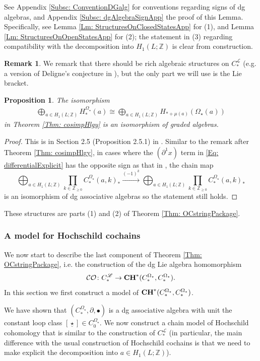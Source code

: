 \documentclass[10pt]{amsart}
\numberwithin{equation}{section}
\theoremstyle{plain}
\newtheorem{proposition}[theorem]{Proposition}
\theoremstyle{definition}
\newtheorem{remark}[theorem]{Remark}
\theoremstyle{remark}
\numberwithin{equation}{section}
\newcommand{\Z}{\mathbb{Z}}
\newcommand{\CO}{\mathcal{CO}}
\newcommand{\CC}{\textbf{\textup{CH}}}
\newcommand{\CFr}{C_*^\mathscr{L}}
\newcommand{\CBa}{C_*^{\Omega_\star}}
\newcommand{\HBa}{H_*^{\Omega_\star}}
\newcommand{\Cba}[1]{C_{#1}^{\Omega_\star}}
\begin{document}
{See Appendix \ref{Subsc: ConventionDGalg} for conventions regarding signs of dg algebras, and Appendix \ref{Subsc: dgAlgebraSignApp} the proof of this Lemma. Specifically, see Lemma \ref{Lm: StructuresOnClosedStatesApp} for  (1), and Lemma  \ref{Lm: StructuresOnOpenStatesApp} for (2); the statement in (3) regarding compatibility with the decomposition into $H_1(L;\Z)$ is clear from construction.



\begin{remark}\label{Rmk: RichStructure}
	We remark that there should be rich algebraic structures on $\CFr$ (e.g. a version of Deligne's conjecture in \cite{Irie1}),  but the only part we will use is the Lie bracket.
\end{remark}

\begin{proposition}
The isomorphism \begin{align*}
		\bigoplus_{a\in H_1(L;\Z)} \HBa(a) \cong \bigoplus_{a\in H_1(L;\Z)} H_{*+\mu(a)}(\Omega_\star(a))
	\end{align*}
	in Theorem \ref{Thm: cosimpHlgy} is an isomorphism of graded algebras.
\end{proposition}

\begin{proof}
	This is in
	Section 2.5 (Proposition 2.5.1) in \cite{WangThesis}.
	Similar to the remark after Theorem \ref{Thm: cosimpHlgy}, in cases where the $(\partial^1 x)$ term  in \eqref{Eq: differentialExplicit} has the opposite sign as that in \cite{WangThesis}, the chain map \[\bigoplus_{a\in H_1(L;\Z)}\prod_{k\in \Z_{\geq 0}} \CBa(a,k)_*\xrightarrow{(-1)^k}\bigoplus_{a\in H_1(L;\Z)}\prod_{k\in \Z_{\geq 0}} \CBa(a,k)_*\] is an isomorphism of dg associative algebras so the statement still holds.
\end{proof}

These structures are parts (1) and (2) of Theorem \ref{Thm: OCstringPackage}.

\subsubsection{A model for Hochschild cochains}\label{Subsubsc: Hochschild}
We now start to describe the last component of Theorem \ref{Thm: OCstringPackage}, i.e. the construction of the dg Lie algebra homomorphism 
\[
	\CO\colon C_*^\mathscr{L} \to \CC^*(\CBa,\CBa).
\]
In this section we first construct a model of $\CC^*(\CBa,\CBa)$.

We have shown that $(\CBa,\partial, \bullet)$ is a dg associative algebra with unit the constant loop class $[\underline{\star}] \in \Cba{0}$. We now construct a chain model of Hochschild cohomology that is similar to the construction of $C_*^\mathscr{L}$ (in particular, the main difference with the usual construction of Hochschild cochains is that we need to make explicit the decomposition into $a\in H_1(L;\Z)$). 

}
\end{document}
